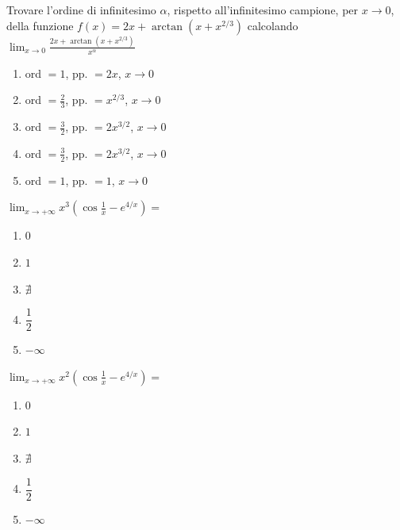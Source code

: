 \begin{quiz}
Trovare l'ordine di infinitesimo $\alpha$, rispetto all'infinitesimo campione, per $x\to0$, della funzione $f(x)=2x+\arctan\left(x+x^{2/3}\right)$ calcolando $\displaystyle\lim_{x\to0}\frac{2x+\arctan(x+x^{2/3})}{x^\alpha}$
\begin{enumerate}
\item ord $=1$, pp. $=2x$, $x\to0$
\item ord $=\frac23$, pp. $=x^{2/3}$, $x\to0$
\item ord $=\frac32$, pp. $=2x^{3/2}$, $x\to0$
\item ord $=\frac32$, pp. $=2x^{3/2}$, $x\to0$
\item ord $=1$, pp. $=1$, $x\to0$
\end{enumerate}
\end{quiz}

\begin{quiz}
$\displaystyle\lim_{x\to+\infty}x^3\left(\cos\frac1x-e^{4/x}\right)=$
\begin{enumerate}
\item $0$
\item $1$
\item $\nexists$
\item $\dfrac12$
\item $-\infty$
\end{enumerate}
\end{quiz}

\begin{quiz}
$\displaystyle\lim_{x\to+\infty}x^2\left(\cos\frac1x-e^{4/x}\right)=$
\begin{enumerate}
\item $0$
\item $1$
\item $\nexists$
\item $\dfrac12$
\item $-\infty$
\end{enumerate}
\end{quiz}

